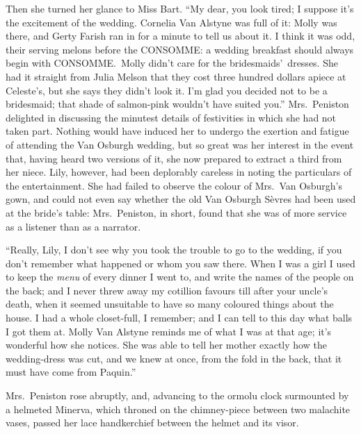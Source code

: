 \documentclass[12pt,a4paper]{book}
\begin{document}
Then she turned her glance to Miss Bart. ``My dear, you look
tired; I suppose it's the excitement of the wedding. Cornelia Van
Alstyne was full of it: Molly was there, and Gerty Farish ran in
for a minute to tell us about it. I think it was odd, their
serving melons before the CONSOMME: a wedding breakfast should
always begin with CONSOMME.\ Molly didn't care for the
bridesmaids'\ dresses. She had it straight from Julia Melson that
they cost three hundred dollars apiece at Celeste's, but she says
they didn't look it. I'm glad you decided not to be a
bridesmaid; that shade of salmon-pink wouldn't have suited you.'' 
Mrs.\ Peniston delighted in discussing the minutest details of
festivities in which she had not taken part. Nothing would have
induced her to undergo the exertion and fatigue of attending the
Van Osburgh wedding, but so great was her interest in the event
that, having heard two versions of it, she now prepared to
extract a third from her niece. Lily, however, had been
deplorably careless in noting the particulars of the
entertainment. She had failed to observe the colour of Mrs.\ Van
Osburgh's gown, and could not even say whether the old Van
Osburgh S\`{e}vres had been used at the bride's table: Mrs.\ Peniston,
in short, found that she was of more service as a listener than
as a narrator.





``Really, Lily, I don't see why you took the trouble to go to the
wedding, if you don't remember what happened or whom you saw
there. When I was a girl I used to keep the \textit{menu} of every dinner
I went to, and write the names of the people on the back; and I
never threw away my cotillion favours till after your uncle's
death, when it seemed unsuitable to have so many coloured things
about the house. I had a whole closet-full, I remember; and I can
tell to this day what balls I got them at. Molly Van Alstyne
reminds me of what I was at that age; it's wonderful how she
notices. She was able to tell her mother exactly how the
wedding-dress was cut, and we knew at once, from the fold in the
back, that it must have come from Paquin.''





Mrs.\ Peniston rose abruptly, and, advancing to the ormolu clock
surmounted by a helmeted Minerva, which throned on the
chimney-piece between two malachite vases, passed her lace
handkerchief between the helmet and its visor.
\end{document}
